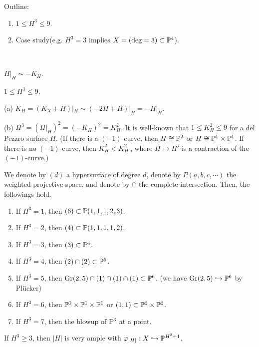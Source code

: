 \documentclass{../../small}
\begin{document}
Outline:
\begin{enumerate}
\item $1\le H^3\le 9$.
\item Case study(e.g. $H^3=3$ implies $X=(\deg=3)\subset\P^4$).
\end{enumerate}

\begin{prop}\,
\begin{parts}
\item $H|_H\sim-K_H$.
\item $1\le H^3\le 9$.
\end{parts}
\end{prop}
\begin{pf}
(a)
$K_H=(K_X+H)|_H\sim(-2H+H)|_H=-H|_H$.

(b)
$H^3=(H|_H)^2=(-K_H)^2=K_H^2$.
It is well-known that $1\le K_H^2\le9$ for a del Pezzro surface $H$.
(If there is a $(-1)$-curve, then $H\cong\P^2$ or $H\cong\P^1\times\P^1$. If there is no $(-1)$-curve, then $K_H^2<K_{H'}^2$, where $H\to H'$ is a contraction of the $(-1)$-curve.)
\end{pf}

\begin{thm}
We denote by $(d)$ a hypersurface of degree $d$, denote by $P(a,b,c,\cdots)$ the weighted projective space, and denote by $\cap$ the complete intersection.
Then, the followings hold.
\begin{enumerate}[(1)]
\item If $H^3=1$, then $(6)\subset\P(1,1,1,2,3)$.
\item If $H^3=2$, then $(4)\subset\P(1,1,1,1,2)$.
\item If $H^3=3$, then $(3)\subset\P^4$.
\item If $H^3=4$, then $(2)\cap(2)\subset\P^5$.
\item If $H^3=5$, then $\mathrm{Gr}(2,5)\cap(1)\cap(1)\cap(1)\subset\P^6$. (we have $\mathrm{Gr}(2,5)\hookrightarrow\P^6$ by Pl\"ucker)
\item If $H^3=6$, then $\P^1\times\P^1\times\P^1$ or $(1,1)\subset\P^2\times\P^2$.
\item If $H^3=7$, then the blowup of $\P^3$ at a point.
\end{enumerate}
\end{thm}
\begin{rmk*}
If $H^3\ge3$, then $|H|$ is very ample with $\f_{|H|}:X\hookrightarrow\P^{H^3+1}$.
\end{rmk*}
\end{document}
